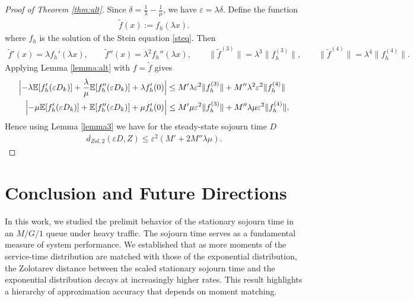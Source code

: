 \documentclass[11pt,letterpaper,reqno]{article}
\theoremstyle{thmstyleone}%
\theoremstyle{thmstyletwo}%
\theoremstyle{thmstylethree}%
\numberwithin{equation}{section}
\begin{document}
 \begin{proof}[Proof of Theorem \ref{thm:alt}]
 Since $\delta=\frac{1}{\lambda}-\frac{1}{\mu}$, we have $ \varepsilon=\lambda \delta$. Define the  function
\begin{align*}
    \tilde f(x) := f_h(\lambda x).
\end{align*}
where $f_h$ is the solution of the Stein equation \eqref{steq}.
Then
\begin{align*}
    \tilde f'(x) = \lambda f_h'(\lambda x), \qquad
\tilde f''(x) = \lambda^2 f_h''(\lambda x),
\qquad
\|\tilde f^{(3)}\| = \lambda^3 \|f_h^{(3)}\|,
\qquad
\|\tilde f^{(4)}\| = \lambda^4 \|f_h^{(4)}\|.
\end{align*}
Applying Lemma \ref{lemma:alt} with $f=\tilde f$ gives
\begin{align*}
    \Bigl|-\lambda \mathbb{E}[f_h'(\varepsilon D_k)] + \frac{\lambda}{\mu}\mathbb{E}[f_h''(\varepsilon D_k)] + \lambda f_h'(0)\Bigr|
&\leq M' \lambda \varepsilon^2\|f_h^{(3)}\|+  M'' \lambda^2 \varepsilon^2\|f_h^{(4)}\| \\
\Bigl|-\mu\mathbb{E}[f_h'(\varepsilon D_k)] + \mathbb{E}[f_h''(\varepsilon D_k)] + \mu f_h'(0)\Bigr|
& \leq  M' \mu \varepsilon^2\|f_h^{(3)}\|+  M'' \lambda \mu \varepsilon^2\|f_h^{(4)}\|.
\end{align*}
Hence using Lemma \ref{lemma3} we have for the steady-state sojourn time $D$
\begin{align*}
    d_{Zol,2}(\varepsilon D, Z) \leq \varepsilon^2(M'+2M'' \lambda \mu).
\end{align*}
\end{proof}
\section{Conclusion and Future Directions}
In this work, we studied the prelimit behavior of the stationary sojourn time in an $M/G/1$ queue under heavy traffic. The sojourn time serves as a fundamental measure of system performance. We established that as more moments of the service-time distribution are matched with those of the exponential distribution, the Zolotarev distance between the scaled stationary sojourn time and the exponential distribution decays at increasingly higher rates. This result highlights a hierarchy of approximation accuracy that depends on moment matching.
\end{document}
